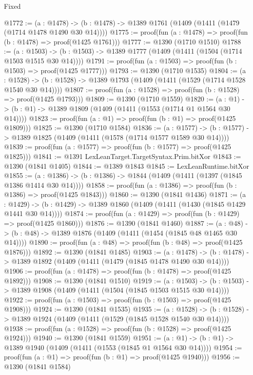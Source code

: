 \begin{lexlean}{Fixed}
\begin{coremodule}
@1772 := (a : @1478) ->
  (b : @1478) -> @1389 @1761 (@1409 (@1411 (@1479 (@1714 @1478 @1490 @30 @14))))
@1775 := proof(fun (a : @1478) => proof(fun (b : @1478) => proof(@1425 @1761)))
@1777 := @1390 (@1710 @1510)
@1788 := (a : @1503) ->
  (b : @1503) -> @1389 @1777 (@1409 (@1411 (@1504 (@1714 @1503 @1515 @30 @14))))
@1791 := proof(fun (a : @1503) => proof(fun (b : @1503) => proof(@1425 @1777)))
@1793 := @1390 (@1710 @1535)
@1804 := (a : @1528) ->
  (b : @1528) -> @1389 @1793 (@1409 (@1411 (@1529 (@1714 @1528 @1540 @30 @14))))
@1807 := proof(fun (a : @1528) => proof(fun (b : @1528) => proof(@1425 @1793)))
@1809 := @1390 (@1710 @1559)
@1820 := (a : @1) -> (b : @1) -> @1389 @1809 (@1409 (@1411 (@1553 (@1714 @1 @1564 @30 @14))))
@1823 := proof(fun (a : @1) => proof(fun (b : @1) => proof(@1425 @1809)))
@1825 := @1390 (@1710 @1584)
@1836 := (a : @1577) ->
  (b : @1577) -> @1389 @1825 (@1409 (@1411 (@1578 (@1714 @1577 @1589 @30 @14))))
@1839 := proof(fun (a : @1577) => proof(fun (b : @1577) => proof(@1425 @1825)))
@1841 := @1391 LexLeanTarget.TargetSyntax.Prim.bitXor
@1843 := @1390 (@1841 @1405)
@1844 := @1389 @1843
@1845 := LexLeanRuntime.bitXor
@1855 := (a : @1386) -> (b : @1386) -> @1844 (@1409 (@1411 (@1397 (@1845 @1386 @1414 @30 @14))))
@1858 := proof(fun (a : @1386) => proof(fun (b : @1386) => proof(@1425 @1843)))
@1860 := @1390 (@1841 @1436)
@1871 := (a : @1429) ->
  (b : @1429) -> @1389 @1860 (@1409 (@1411 (@1430 (@1845 @1429 @1441 @30 @14))))
@1874 := proof(fun (a : @1429) => proof(fun (b : @1429) => proof(@1425 @1860)))
@1876 := @1390 (@1841 @1460)
@1887 := (a : @48) -> (b : @48) -> @1389 @1876 (@1409 (@1411 (@1454 (@1845 @48 @1465 @30 @14))))
@1890 := proof(fun (a : @48) => proof(fun (b : @48) => proof(@1425 @1876)))
@1892 := @1390 (@1841 @1485)
@1903 := (a : @1478) ->
  (b : @1478) -> @1389 @1892 (@1409 (@1411 (@1479 (@1845 @1478 @1490 @30 @14))))
@1906 := proof(fun (a : @1478) => proof(fun (b : @1478) => proof(@1425 @1892)))
@1908 := @1390 (@1841 @1510)
@1919 := (a : @1503) ->
  (b : @1503) -> @1389 @1908 (@1409 (@1411 (@1504 (@1845 @1503 @1515 @30 @14))))
@1922 := proof(fun (a : @1503) => proof(fun (b : @1503) => proof(@1425 @1908)))
@1924 := @1390 (@1841 @1535)
@1935 := (a : @1528) ->
  (b : @1528) -> @1389 @1924 (@1409 (@1411 (@1529 (@1845 @1528 @1540 @30 @14))))
@1938 := proof(fun (a : @1528) => proof(fun (b : @1528) => proof(@1425 @1924)))
@1940 := @1390 (@1841 @1559)
@1951 := (a : @1) -> (b : @1) -> @1389 @1940 (@1409 (@1411 (@1553 (@1845 @1 @1564 @30 @14))))
@1954 := proof(fun (a : @1) => proof(fun (b : @1) => proof(@1425 @1940)))
@1956 := @1390 (@1841 @1584)

\end{coremodule}
\end{lexlean}

